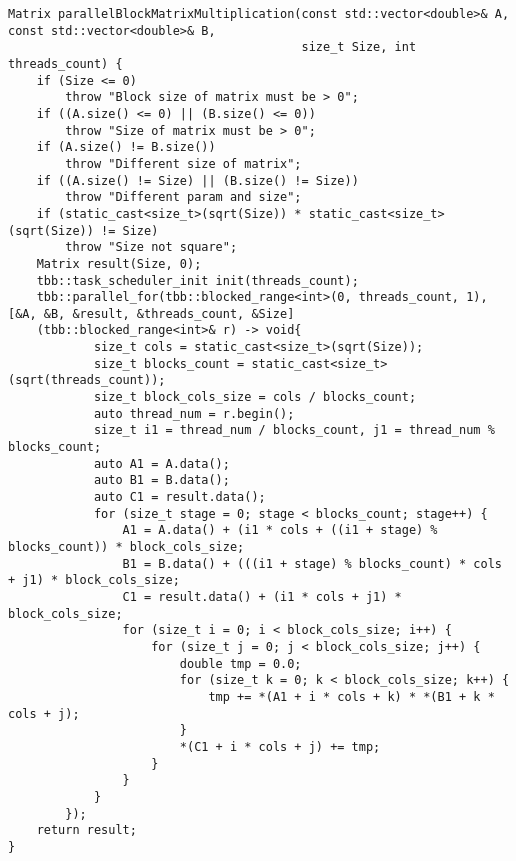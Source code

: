 \documentclass{report}
\begin{document}
\begin{lstlisting}
Matrix parallelBlockMatrixMultiplication(const std::vector<double>& A, const std::vector<double>& B,
                                         size_t Size, int threads_count) {
    if (Size <= 0)
        throw "Block size of matrix must be > 0";
    if ((A.size() <= 0) || (B.size() <= 0))
        throw "Size of matrix must be > 0";
    if (A.size() != B.size())
        throw "Different size of matrix";
    if ((A.size() != Size) || (B.size() != Size))
        throw "Different param and size";
    if (static_cast<size_t>(sqrt(Size)) * static_cast<size_t>(sqrt(Size)) != Size)
        throw "Size not square";
    Matrix result(Size, 0);
    tbb::task_scheduler_init init(threads_count);
    tbb::parallel_for(tbb::blocked_range<int>(0, threads_count, 1), [&A, &B, &result, &threads_count, &Size]
    (tbb::blocked_range<int>& r) -> void{
            size_t cols = static_cast<size_t>(sqrt(Size));
            size_t blocks_count = static_cast<size_t>(sqrt(threads_count));
            size_t block_cols_size = cols / blocks_count;
            auto thread_num = r.begin();
            size_t i1 = thread_num / blocks_count, j1 = thread_num % blocks_count;
            auto A1 = A.data();
            auto B1 = B.data();
            auto C1 = result.data();
            for (size_t stage = 0; stage < blocks_count; stage++) {
                A1 = A.data() + (i1 * cols + ((i1 + stage) % blocks_count)) * block_cols_size;
                B1 = B.data() + (((i1 + stage) % blocks_count) * cols + j1) * block_cols_size;
                C1 = result.data() + (i1 * cols + j1) * block_cols_size;
                for (size_t i = 0; i < block_cols_size; i++) {
                    for (size_t j = 0; j < block_cols_size; j++) {
                        double tmp = 0.0;
                        for (size_t k = 0; k < block_cols_size; k++) {
                            tmp += *(A1 + i * cols + k) * *(B1 + k * cols + j);
                        }
                        *(C1 + i * cols + j) += tmp;
                    }
                }
            }
        });
    return result;
}
\end{lstlisting}
\end{document}
